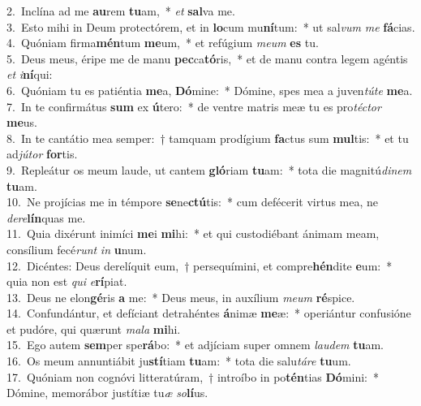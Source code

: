 {2.~}Inclína ad me \textbf{au}rem \textbf{tu}am,~* \textit{et} \textbf{sal}va me.\\
{3.~}Esto mihi in Deum protectórem, et in \textbf{lo}cum mu\textbf{ní}tum:~* ut sal\textit{vum} \textit{me} \textbf{fá}cias.\\
{4.~}Quóniam firma\textbf{mén}tum \textbf{me}um,~* et refúgium \textit{me}\textit{um} \textbf{es} tu.\\
{5.~}Deus meus, éripe me de manu \textbf{pec}ca\textbf{tó}ris,~* et de manu contra legem agéntis \textit{et} \textit{i}\textbf{ní}qui:\\
{6.~}Quóniam tu es patiéntia \textbf{me}a, \textbf{Dó}mine:~* Dómine, spes mea a juven\textit{tú}\textit{te} \textbf{me}a.\\
{7.~}In te confirmátus \textbf{sum} ex \textbf{ú}tero:~* de ventre matris meæ tu es pro\textit{té}\textit{ctor} \textbf{me}us.\\
{8.~}In te cantátio mea semper:~† tamquam prodígium \textbf{fa}ctus sum \textbf{mul}tis:~* et tu ad\textit{jú}\textit{tor} \textbf{for}tis.\\
{9.~}Repleátur os meum laude, ut cantem \textbf{gló}riam \textbf{tu}am:~* tota die magnitú\textit{di}\textit{nem} \textbf{tu}am.\\
{10.~}Ne projícias me in témpore \textbf{se}ne\textbf{ctú}tis:~* cum defécerit virtus mea, ne \textit{de}\textit{re}\textbf{lín}quas me.\\
{11.~}Quia dixérunt inimíci \textbf{me}i \textbf{mi}hi:~* et qui custodiébant ánimam meam, consílium fecé\textit{runt} \textit{in} \textbf{u}num.\\
{12.~}Dicéntes: Deus derelíquit eum,~† persequímini, et compre\textbf{hén}dite \textbf{e}um:~* quia non est \textit{qui} \textit{e}\textbf{rí}piat.\\
{13.~}Deus ne elon\textbf{gé}ris \textbf{a} me:~* Deus meus, in auxílium \textit{me}\textit{um} \textbf{ré}spice.\\
{14.~}Confundántur, et defíciant detrahéntes \textbf{á}nimæ \textbf{me}æ:~* operiántur confusióne et pudóre, qui quærunt \textit{ma}\textit{la} \textbf{mi}hi.\\
{15.~}Ego autem \textbf{sem}per spe\textbf{rá}bo:~* et adjíciam super omnem \textit{lau}\textit{dem} \textbf{tu}am.\\
{16.~}Os meum annuntiábit ju\textbf{stí}tiam \textbf{tu}am:~* tota die salu\textit{tá}\textit{re} \textbf{tu}um.\\
{17.~}Quóniam non cognóvi litteratúram,~† introíbo in po\textbf{tén}tias \textbf{Dó}mini:~* Dómine, memorábor justítiæ tu\textit{æ} \textit{so}\textbf{lí}us.\\
